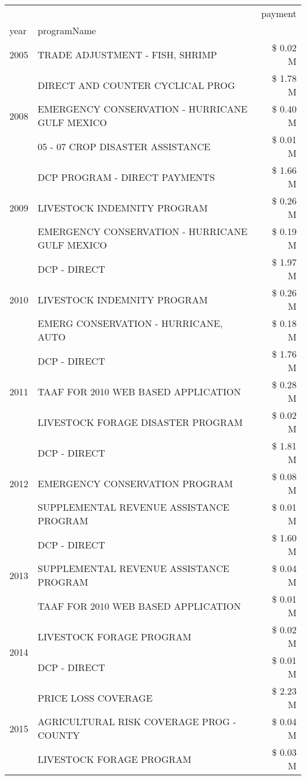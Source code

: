 \begin{tabular}{llr}
\toprule
 &  & payment \\
year & programName &  \\
\midrule
2005 & TRADE ADJUSTMENT - FISH, SHRIMP & \$ 0.02 M \\
\cline{1-3}
\multirow[t]{3}{*}{2008} & DIRECT AND COUNTER CYCLICAL PROG & \$ 1.78 M \\
 & EMERGENCY CONSERVATION - HURRICANE GULF MEXICO & \$ 0.40 M \\
 & 05 - 07 CROP DISASTER ASSISTANCE & \$ 0.01 M \\
\cline{1-3}
\multirow[t]{3}{*}{2009} & DCP PROGRAM - DIRECT PAYMENTS & \$ 1.66 M \\
 & LIVESTOCK INDEMNITY PROGRAM & \$ 0.26 M \\
 & EMERGENCY CONSERVATION - HURRICANE GULF MEXICO & \$ 0.19 M \\
\cline{1-3}
\multirow[t]{3}{*}{2010} & DCP - DIRECT & \$ 1.97 M \\
 & LIVESTOCK INDEMNITY PROGRAM & \$ 0.26 M \\
 & EMERG CONSERVATION - HURRICANE, AUTO & \$ 0.18 M \\
\cline{1-3}
\multirow[t]{3}{*}{2011} & DCP - DIRECT & \$ 1.76 M \\
 & TAAF FOR 2010 WEB BASED APPLICATION & \$ 0.28 M \\
 & LIVESTOCK FORAGE DISASTER PROGRAM & \$ 0.02 M \\
\cline{1-3}
\multirow[t]{3}{*}{2012} & DCP - DIRECT & \$ 1.81 M \\
 & EMERGENCY CONSERVATION PROGRAM & \$ 0.08 M \\
 & SUPPLEMENTAL REVENUE ASSISTANCE PROGRAM & \$ 0.01 M \\
\cline{1-3}
\multirow[t]{3}{*}{2013} & DCP - DIRECT & \$ 1.60 M \\
 & SUPPLEMENTAL REVENUE ASSISTANCE PROGRAM & \$ 0.04 M \\
 & TAAF FOR 2010 WEB BASED APPLICATION & \$ 0.01 M \\
\cline{1-3}
\multirow[t]{2}{*}{2014} & LIVESTOCK FORAGE PROGRAM & \$ 0.02 M \\
 & DCP - DIRECT & \$ 0.01 M \\
\cline{1-3}
\multirow[t]{3}{*}{2015} & PRICE LOSS COVERAGE & \$ 2.23 M \\
 & AGRICULTURAL RISK COVERAGE PROG - COUNTY & \$ 0.04 M \\
 & LIVESTOCK FORAGE PROGRAM & \$ 0.03 M \\
\cline{1-3}

\end{tabular}
